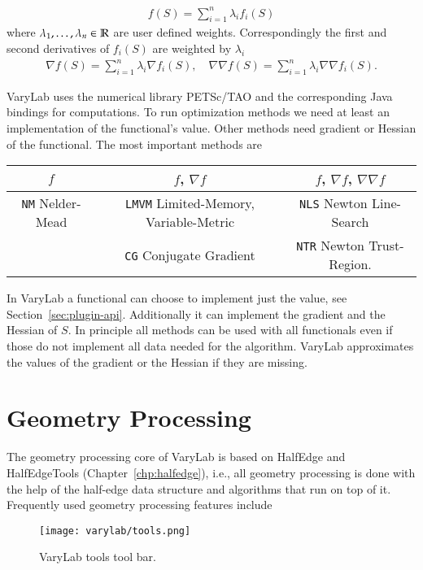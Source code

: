 \documentclass[Thesis.tex]{subfiles}
\begin{document}
\begin{eqnarray*}
	f(S) = \sum_{i=1}^n \lambda_i f_i(S)
\end{eqnarray*}
where $\lambda_1,\ldots,\lambda_n\in \mathbb R$ are user defined weights. Correspondingly the first and second  derivatives of $f_i(S)$ are weighted by $\lambda_i$
\begin{eqnarray*}
	\nabla f(S) = \sum_{i=1}^n \lambda_i \nabla f_i(S), \quad \nabla\nabla f(S) = \sum_{i=1}^n \lambda_i \nabla\nabla f_i(S).
\end{eqnarray*}

{\sc VaryLab} uses the numerical library {\sc PETSc}/{\sc TAO} \cite{petsc-user-ref, petsc-web-page, tao-user-ref} and the corresponding {\sc Java} bindings \cite{jpetsctao-web-page} for computations. To run optimization methods we need at least an implementation of the functional's value. Other methods need gradient or Hessian of the functional. The most important methods are
 
\begin{tabular}{c | c | c}
	$f$ & $f$, $\nabla f$ & $f$, $\nabla f$, $\nabla\nabla f$\\ \hline
	{\tt NM} Nelder-Mead & {\tt LMVM} Limited-Memory, Variable-Metric & {\tt NLS} Newton Line-Search \\
	& {\tt CG} Conjugate Gradient & {\tt NTR} Newton Trust-Region.
\end{tabular}

In {\sc VaryLab} a functional can choose to implement just the value, see Section~\ref{sec:plugin-api}. Additionally it can implement the gradient and the Hessian of $S$. In principle all methods can be used with all functionals even if those do not implement all data needed for the algorithm. {\sc VaryLab} approximates the values of the gradient or the Hessian if they are missing.

\section{Geometry Processing}

The geometry processing core of {\sc VaryLab} is based on {\sc HalfEdge} and {\sc HalfEdgeTools} (Chapter~\ref{chp:halfedge}), i.e., all geometry processing is done with the help of the half-edge data structure and algorithms that run on top of it. Frequently used geometry processing features include

\begin{figure}
    \begin{center}
    \texttt{[image: varylab/tools.png]}
    \caption{{\sc VaryLab} tools tool bar.}
    \label{fig:varylab_tools_ui}
    \end{center}
\end{figure}
\end{document}
